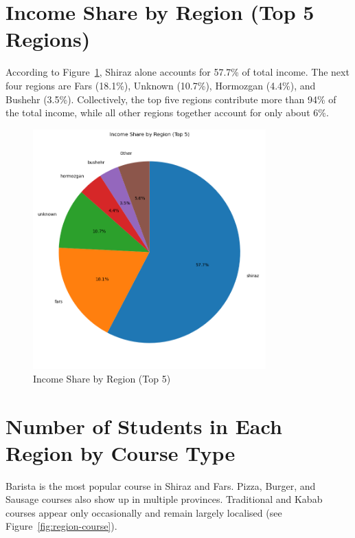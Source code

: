 \documentclass[12pt,a4paper]{article}
\begin{document}
\section{Income Share by Region (Top 5 Regions)}
According to Figure~\ref{fig:income-share}, Shiraz alone accounts for 57.7\% of total income. The next four regions are Fars (18.1\%), Unknown (10.7\%), Hormozgan (4.4\%), and Bushehr (3.5\%). Collectively, the top five regions contribute more than 94\% of the total income, while all other regions together account for only about 6\%.

\begin{figure}[h!]
    \centering
    \includegraphics[width=0.8\textwidth]{Income Share by Region (Top 5) Pie Chart.png}
    \caption{Income Share by Region (Top 5)}
    \label{fig:income-share}
\end{figure}

\section{Number of Students in Each Region by Course Type}
Barista is the most popular course in Shiraz and Fars. Pizza, Burger, and Sausage courses also show up in multiple provinces. Traditional and Kabab courses appear only occasionally and remain largely localised (see Figure~\ref{fig:region-course}).
\end{document}
